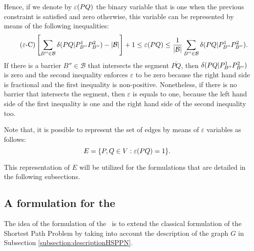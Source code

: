 \documentclass[a4paper]{elsarticle}
\newcommand{\SPPN}{{\sf{H-SPPN}\xspace }}
\newcommand{\B}{{\mathcal B}}
\newcommand{\CV}[1]{{\color{atomictangerine}#1}}
\begin{document}
	Hence, if we denote by $\varepsilon(PQ)$ the binary variable that is one when the previous constraint is satisfied and zero otherwise, this variable can be represented by means of the following inequalities:
	\begin{equation*}\tag{$\varepsilon$-C}\label{eq:varepsilonC}
		\left[\sum_{B''\in\mathcal B}\deltacheck{P}{Q}{P^1_{B''}}{P^2_{B''}}-|\mathcal B|\right] + 1\leq \varepsilonvar{P}{Q}\leq \frac{1}{|\B|}\sum_{B''\in\mathcal B}\deltacheck{P}{Q}{P^1_{B''}}{P^2_{B''}}.
	\end{equation*}
	If there is a barrier $B''\in\B$ that intersects the segment $\overline{PQ}$, then $\delta(PQ|P^1_{B''}P^2_{B''})$ is zero and the second inequality enforces $\varepsilon$ to be zero because the right hand side is fractional and the first inequality is non-positive. Nonetheless, if there is no barrier that intersects the segment, then $\varepsilon$ is equals to one, because the left hand side of the first inequality is one and the right hand side of the second inequality too. 
	
	Note that, it is possible to represent the set of edges by means of $\varepsilon$ variables as follows:
	$$ E = \{P, Q\in V:\varepsilon(PQ)=1\}.$$
	
	This representation of $E$ will be utilized for the formulations that are detailed in the following subsections. 
	
	
	
	
	
	
	
	\subsection{A formulation for the \SPPN}
	\CV{The idea of the formulation of the \SPPN \ is to extend the classical formulation of the Shortest Path Problem by taking into account the description of the graph $G$ in Subsection \ref{subsection:descriptionHSPPN}. }
	
	\newcommand{\yvar}[2]{y(#1#2)}
	
\end{document}
